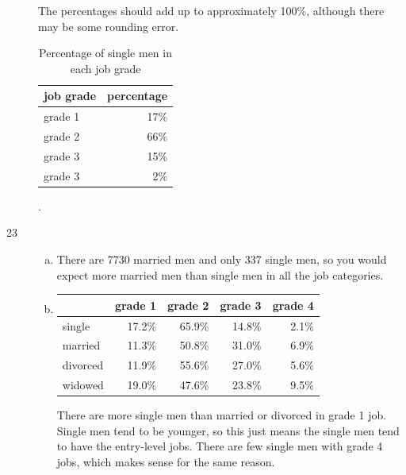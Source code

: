 \documentclass[letterpaper, landscape]{exam}
\begin{document}
\begin{description}
      The percentages should add up to approximately 100\%, although there may
      be some rounding error.

      \begin{table}[H]
        \centering
        \begin{tabular}{lr}
          \toprule
          job grade & percentage \\
          \midrule
          grade 1   & 17\%  \\
          grade 2   & 66\%  \\
          grade 3   & 15\%  \\
          grade 3   & 2\%   \\
          \bottomrule
        \end{tabular}
        \caption{Percentage of single men in each job grade}.\label{tab:ex22}
      \end{table}


    \item[23]
      \begin{enumerate}[(a)]
        \item There are 7730 married men and only 337 single men, so you would expect
        more married men than single men in all the job categories.

        \item 

          \begin{table}[H]
            \centering
            \begin{tabular}{lrrrr}
              \toprule
                       & grade 1 & grade 2 & grade 3 & grade 4 \\
              \midrule
              single   & 17.2\%  & 65.9\%  & 14.8\%  & 2.1\% \\
              married  & 11.3\%  & 50.8\%  & 31.0\%  & 6.9\% \\
              divorced & 11.9\%  & 55.6\%  & 27.0\%  & 5.6\% \\
              widowed  & 19.0\%  & 47.6\%  & 23.8\%  & 9.5\% \\
              \bottomrule
            \end{tabular}
          \end{table}

          There are more single men than married or divorced in grade 1 job.  
          Single men tend to be younger, so this just means the single men tend to
          have the entry-level jobs.  There are few single men with grade 4 jobs,
          which makes sense for the same reason.


\end{enumerate}
\end{description}
\end{document}
